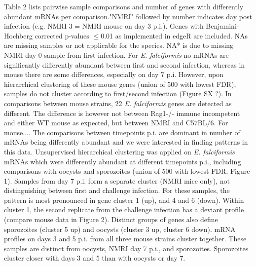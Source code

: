 \documentclass{bmcart}
\begin{document}
Table 2 lists pairwise sample comparisons and number of genes with differently abundant mRNAs per comparison."NMRI" followed by number indicates day post infection (e.g. NMRI 3 = NMRI mouse on day 3 p.i.). Genes with Benjamini-Hochberg corrected p-values $\leq$0.01 as implemented in edgeR are included. NAs are missing samples or not applicable for the species. NA* is due to missing NMRI day 0 sample from first infection. For \textit{E. falciformis} no mRNAs are significantly differently abundant between first and second infection, whereas in mouse there are some differences, especially on day 7 p.i. However, upon hierarchical clustering of these mouse genes (union of 500 with lowest FDR), samples do not cluster according to first/second infection (Figure SX ?). In comparisons between mouse strains, 22 \textit{E. falciformis} genes are detected as different. The difference is however not between Rag1-/- immune incompetent and either WT mouse as expected, but between NMRI and C57BL/6. For mouse.... 
The comparisons between timepoints p.i. are dominant in number of mRNAs being differently abundant and we were interested in finding patterns in this data. Unsupervised hierarchical clustering was applied on \textit{E. falciformis} mRNAs which were differently abundant at different timepoints p.i., including comparisons with oocysts and sporozoites (union of 500 with lowest FDR, Figure 1). Samples from day 7 p.i. form a separate cluster (NMRI mice only), not distinguishing between first and challenge infection. For these samples, the pattern is most pronounced in gene cluster 1 (up), and 4 and 6 (down). Within cluster 1, the second replicate from the challenge infection has a deviant profile (compare mouse data in Figure 2). Distinct groups of genes also define sporozoites (cluster 5 up) and oocysts (cluster 3 up, cluster 6 down). mRNA profiles on days 3 and 5 p.i. from all three mouse strains cluster together. These samples are distinct from oocysts, NMRI day 7 p.i., and sporozoites. Sporozoites cluster closer with days 3 and 5 than with oocysts or day 7.

\clearpage
\end{document}
